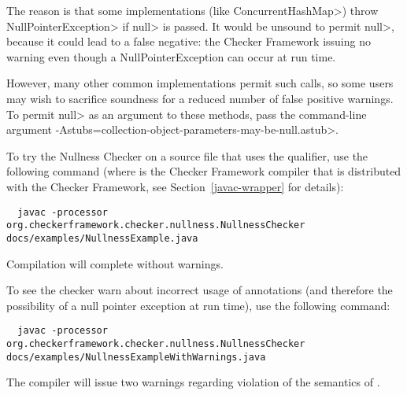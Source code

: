 The reason is that some implementations (like \<ConcurrentHashMap>) throw
\<NullPointerException> if \<null> is passed.  It would be unsound to
permit \<null>, because it could lead to a false negative:  the Checker
Framework issuing no warning even though a NullPointerException can occur
at run time.

However, many other common implementations permit such calls, so some users
may wish to sacrifice soundness for a reduced number of false positive
warnings.  To permit \<null> as an argument to these methods, pass the
command-line argument
\<-Astubs=collection-object-parameters-may-be-null.astub>.




To try the Nullness Checker on a source file that uses the  qualifier,
use the following command (where  is the Checker Framework compiler that
is distributed with the Checker Framework, see Section~\ref{javac-wrapper}
for details):

\begin{smaller}
\begin{Verbatim}
  javac -processor org.checkerframework.checker.nullness.NullnessChecker docs/examples/NullnessExample.java
\end{Verbatim}
\end{smaller}

\noindent
Compilation will complete without warnings.

To see the checker warn about incorrect usage of annotations (and therefore the
possibility of a null pointer exception at run time), use the following command:

\begin{mysmall}
\begin{Verbatim}
  javac -processor org.checkerframework.checker.nullness.NullnessChecker docs/examples/NullnessExampleWithWarnings.java
\end{Verbatim}
\end{mysmall}


\noindent
The compiler will issue two warnings regarding violation of the semantics of
.



